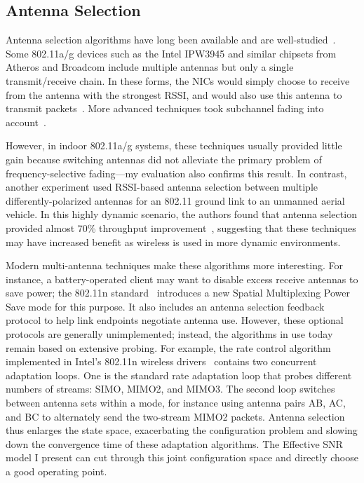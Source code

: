 \subsection{Antenna Selection}
Antenna selection algorithms have long been available and are well-studied~\cite{Tse}. Some 802.11a/g devices such as the Intel IPW3945 and similar chipsets from Atheros and Broadcom include multiple antennas but only a single transmit/receive chain. In these forms, the NICs would simply choose to receive from the antenna with the strongest RSSI, and would also use this antenna to transmit packets~\cite{Broadcom_MIMOChip,Cheng_AntSel}. More advanced techniques took subchannel fading into account~\cite{Zhang_AntSel}.

However, in indoor 802.11a/g systems, these techniques usually provided little gain because switching antennas did not alleviate the primary problem of frequency-selective fading---my evaluation also confirms this result. In contrast, another experiment used RSSI-based antenna selection between multiple differently-polarized antennas for an 802.11 ground link to an unmanned aerial vehicle. In this highly dynamic scenario, the authors found that antenna selection provided almost 70\% throughput improvement~\cite{Vlah_UAV}, suggesting that these techniques may have increased benefit as wireless is used in more dynamic environments.

Modern multi-antenna techniques make these algorithms more interesting. For instance, a battery-operated client may want to disable excess receive antennas to save power; the 802.11n standard~\cite{80211n} introduces a new Spatial Multiplexing Power Save mode for this purpose. It also includes an antenna selection feedback protocol to help link endpoints negotiate antenna use. However, these optional protocols are generally unimplemented; instead, the algorithms in use today remain based on extensive probing. For example, the rate control algorithm implemented in Intel's 802.11n wireless drivers~\cite{iwlwifi} contains two concurrent adaptation loops. One is the standard rate adaptation loop that probes different numbers of streams: SIMO, MIMO2, and MIMO3. The second loop switches between antenna sets within a mode, for instance using antenna pairs AB, AC, and BC to alternately send the two-stream MIMO2 packets. Antenna selection thus enlarges the state space, exacerbating the configuration problem and slowing down the convergence time of these adaptation algorithms. The Effective SNR model I present can cut through this joint configuration space and directly choose a good operating point.

